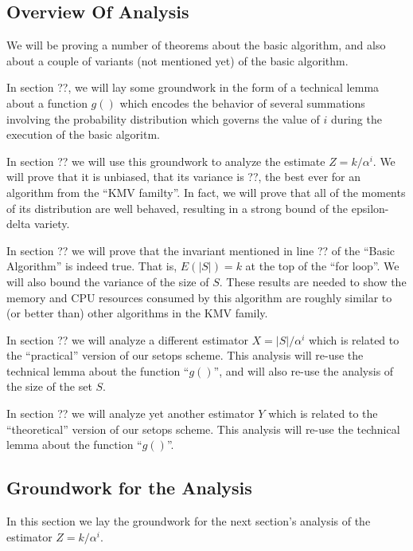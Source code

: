 \documentclass{sig-alternate}
\begin{document}
\subsection{Overview Of Analysis}

We will be proving a number of theorems about the basic algorithm, and also about a 
couple of variants (not mentioned yet) of the basic algorithm.

In section ??, we will lay some groundwork in the form of  
a technical lemma about a function $g()$ which encodes the 
behavior of several summations involving the probability distribution
which governs the value of $i$ during the execution of the basic algoritm.

In section ?? we will use this groundwork to analyze the estimate $Z = k / \alpha^i$. We will
prove that it is unbiased, that its variance is ??, the best ever for
an algorithm from the ``KMV familty''. In fact, we will prove that all
of the moments of its distribution are well behaved, resulting in a
strong bound of the epsilon-delta variety. 

In section ?? we will prove that the invariant mentioned in line ?? of
the ``Basic Algorithm'' is indeed true.  That is, $E(|S|) = k$ at the
top of the ``for loop''.  We will also bound the variance of the size
of $S$. These results are needed to show the memory and CPU resources
consumed by this algorithm are roughly similar to (or better than)
other algorithms in the KMV family.

In section ?? we will analyze a different estimator $X=|S|/\alpha^i$ 
which is related to the ``practical'' version of our setops scheme. 
This analysis will re-use the technical lemma about the function ``$g()$'', and will 
also re-use the analysis of the size of the set $S$.

In section ?? we will analyze yet another estimator $Y$ which is related to
the ``theoretical'' version of our setops scheme. This analysis
will re-use the technical lemma about the function ``$g()$''.


\subsection{Groundwork for the Analysis}

In this section we lay the groundwork for the next section's analysis
of the estimator $Z = k / \alpha^i$.

\end{document}

